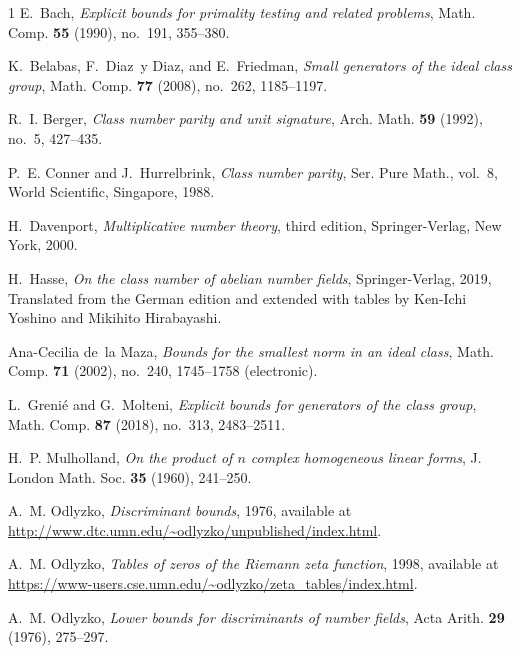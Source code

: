 \documentclass[a4paper,11pt]{amsart}
\theoremstyle{remark}
\begin{document}
\begin{thebibliography}{1}
E.~Bach, \emph{Explicit bounds for primality testing and related problems},
  Math. Comp. \textbf{55} (1990), no.~191, 355--380.

K.~Belabas, F.~Diaz~y Diaz, and E.~Friedman, \emph{Small generators of the ideal class group},
  Math. Comp. \textbf{77} (2008), no.~262, 1185--1197.

R.~I. Berger, \emph{Class number parity and unit signature}, Arch. Math.
  \textbf{59} (1992), no.~5, 427--435.

P.~E. Conner and J.~Hurrelbrink, \emph{Class number parity}, Ser. Pure Math.,
  vol.~8, World Scientific, Singapore, 1988.

H.~Davenport, \emph{Multiplicative number theory},
  third edition, Springer-Verlag, New York, 2000.

H.~Hasse, \emph{On the class number of abelian number fields}, Springer-Verlag,
  2019, Translated from the German edition and extended with tables by Ken-Ichi
  Yoshino and Mikihito Hirabayashi.

Ana-Cecilia de~la Maza, \emph{Bounds for the smallest norm in an ideal class},
  Math. Comp. \textbf{71} (2002), no.~240, 1745--1758 (electronic).

L.~Greni\'{e} and G.~Molteni, \emph{Explicit bounds for generators of the class group},
  Math. Comp. \textbf{87} (2018), no.~313, 2483--2511.

H.~P. Mulholland, \emph{On the product of {$n$} complex homogeneous linear forms},
  J. London Math. Soc. \textbf{35} (1960), 241--250.

A.~M. Odlyzko, \emph{Discriminant bounds}, 1976,
  available at \\
  \url{http://www.dtc.umn.edu/~odlyzko/unpublished/index.html}.

A.~M. Odlyzko, \emph{Tables of zeros of the Riemann zeta function}, 1998,
  available at \\
  \url{https://www-users.cse.umn.edu/~odlyzko/zeta_tables/index.html}.

A.~M. Odlyzko, \emph{Lower bounds for discriminants of number fields}, Acta
  Arith. \textbf{29} (1976), 275--297.


\end{thebibliography}
\end{document}
